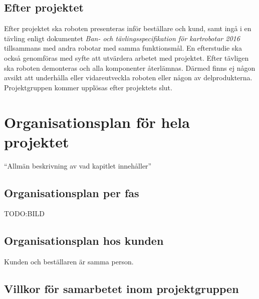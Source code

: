 \documentclass{article}
\begin{document}
\subsection{Efter projektet}
Efter projektet ska roboten presenteras inför beställare och kund, samt ingå i en tävling enligt dokumentet \textit{Ban- och tävlingsspecifikation för kartrobotar 2016} tillsammans med andra robotar med samma funktionsmål. En efterstudie ska också genomföras med syfte att utvärdera arbetet med projektet. Efter tävligen ska roboten demonteras och alla komponenter återlämnas. Därmed finns ej någon avsikt att underhålla eller vidareutveckla roboten eller någon av delprodukterna. Projektgruppen kommer upplösas efter projektets slut.

\section{Organisationsplan för hela projektet}
``Allmän beskrivning av vad kapitlet innehåller''
\subsection{Organisationsplan per fas}
TODO:BILD

\subsection{Organisationsplan hos kunden}
Kunden och beställaren är samma person.

\subsection{Villkor för samarbetet inom projektgruppen}
\label{subsec:villkorsamarbete}
\end{document}
